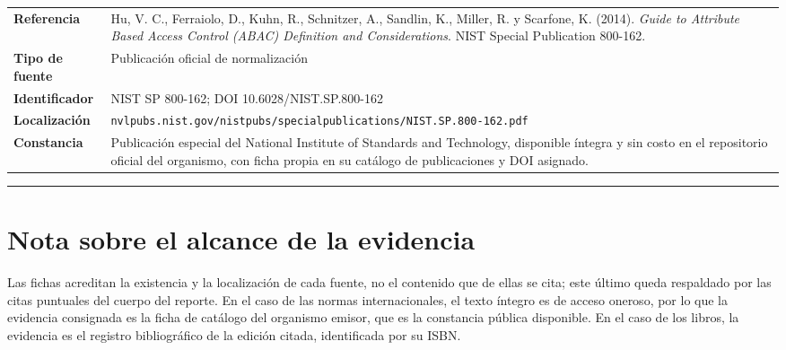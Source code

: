 \documentclass[12pt,letterpaper]{article}
\begin{document}
\begin{table}[H]
  \small
  \renewcommand{\arraystretch}{1.25}
  \begin{tabularx}{\textwidth}{@{}>{\raggedright\arraybackslash}p{3.0cm}>{\raggedright\arraybackslash}X@{}}
    \toprule
    \multicolumn{2}{@{}l}{\textbf{Ficha A-26} \quad\textnormal{\footnotesize clave de cita: \texttt{hu2014abac}}} \\
    \midrule
    \textbf{Referencia} & Hu, V. C., Ferraiolo, D., Kuhn, R., Schnitzer, A., Sandlin, K., Miller, R. y Scarfone, K. (2014). \emph{Guide to Attribute Based Access Control (ABAC) Definition and Considerations}. NIST Special Publication 800-162. \\
    \textbf{Tipo de fuente} & Publicación oficial de normalización \\
    \textbf{Identificador} & NIST SP 800-162; DOI 10.6028/NIST.SP.800-162 \\
    \textbf{Localización} & \texttt{\footnotesize nvlpubs.nist.gov/nistpubs/specialpublications/\allowbreak NIST.SP.800-162.pdf} \\
    \textbf{Constancia} & Publicación especial del National Institute of Standards and Technology, disponible íntegra y sin costo en el repositorio oficial del organismo, con ficha propia en su catálogo de publicaciones y DOI asignado. \\
    \bottomrule
  \end{tabularx}
\end{table}

\vspace{10pt}
\hrule
\vspace{8pt}

\section*{Nota sobre el alcance de la evidencia}

Las fichas acreditan la existencia y la localización de cada fuente, no el contenido que de ellas se cita; este último
queda respaldado por las citas puntuales del cuerpo del reporte. En el caso de las normas internacionales, el texto
íntegro es de acceso oneroso, por lo que la evidencia consignada es la ficha de catálogo del organismo emisor, que es
la constancia pública disponible. En el caso de los libros, la evidencia es el registro bibliográfico de la edición
citada, identificada por su ISBN.
\end{document}
